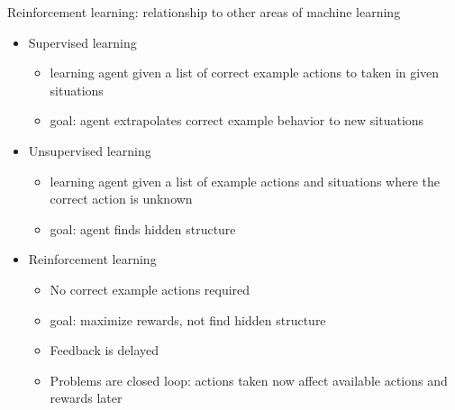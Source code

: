 \documentclass[handout]{beamer}
\begin{document}
%
%
%

\begin{frame}[c]{Reinforcement learning: relationship to other areas of machine learning}
\begin{itemize}[<+->]
  \item Supervised learning
  \begin{itemize}
    \item learning agent given a list of correct example actions to taken in given situations
    \item goal: agent extrapolates correct example behavior to new situations
  \end{itemize}
  \item Unsupervised learning
  \begin{itemize}
    \item learning agent given a list of example actions and situations where the correct action is unknown
    \item goal: agent finds hidden structure
  \end{itemize} 
  \item Reinforcement learning
\begin{itemize}
  \item No correct example actions required
  \item goal: maximize rewards, not find hidden structure
  \item Feedback is delayed 
  \item Problems are closed loop: actions taken now affect available actions and rewards later
\end{itemize} 
\end{itemize}
\end{frame}
\end{document}
